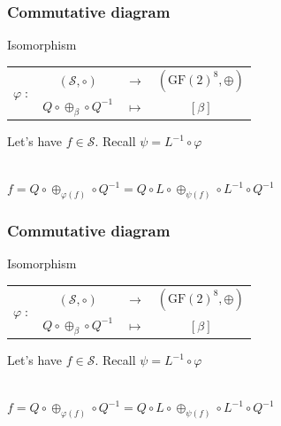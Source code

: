 \documentclass{beamer}
\newcommand{\gf}{\ensuremath{\text{GF}\left(2\right)}}
\begin{document}
\begin{frame}\frametitle{Commutative diagram}
    \begin{block}{Isomorphism}
    \begin{center}
    \begin{tabular}{ r  c c c }
	\multirow{2}{*}{$\varphi \; :$} & $(\mathcal{S}, \circ )$  & $\longrightarrow$ & $(\gf^8, \oplus)$ \\
	                                & $Q \circ \oplus_{\beta} \circ Q^{-1} $ & $\longmapsto$ & $\left[ \beta \right]$
    \end{tabular}
    \end{center}
    \end{block}
    
    \medskip
    Let's have $f \in \mathcal{S}$. Recall $\psi = L^{-1} \circ \varphi$ \\
    \bigskip
    
    \\
    $f = Q \circ \oplus_{\varphi(f)} \circ Q^{-1} = Q \circ L \circ \oplus_{\psi(f)} \circ L^{-1} \circ Q^{-1} $
\end{frame}

\begin{frame}\frametitle{Commutative diagram}
    \begin{block}{Isomorphism}
    \begin{center}
    \begin{tabular}{ r  c c c }
	\multirow{2}{*}{$\varphi \; :$} & $(\mathcal{S}, \circ )$  & $\longrightarrow$ & $(\gf^8, \oplus)$ \\
	                                & $Q \circ \oplus_{\beta} \circ Q^{-1} $ & $\longmapsto$ & $\left[ \beta \right]$
    \end{tabular}
    \end{center}
    \end{block}
    
    \medskip
    Let's have $f \in \mathcal{S}$. Recall $\psi = L^{-1} \circ \varphi$ \\
    \bigskip
    
    \\
    $f = Q \circ \oplus_{\varphi(f)} \circ Q^{-1} = Q \circ L \circ \oplus_{\psi(f)} \circ L^{-1} \circ Q^{-1} $
\end{frame}
\end{document}
